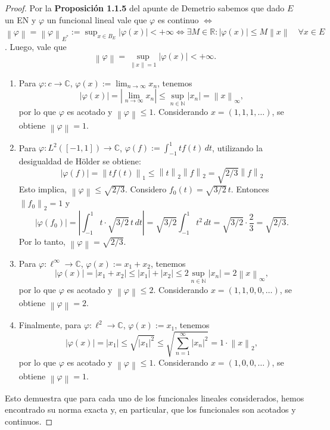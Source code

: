\documentclass{article}
\theoremstyle{definition}
\newcommand{\R}{\mathbb{R}}
\newcommand{\N}{\mathbb{N}}
\newcommand{\C}{\mathbb{C}}
\newcommand{\norm}[1]{\left\lVert #1 \right\rVert}       %
\begin{document}
\begin{proof}
    Por la \textbf{Proposición 1.1.5} del apunte de Demetrio sabemos que dado \( E \) un EN y \( \varphi \) un funcional lineal vale que \( \varphi \) es continuo \( \iff \) \( \norm{\varphi} = \norm{\varphi}_{E^*} := \sup_{x \in B_E} |\varphi(x)| < +\infty \iff \exists M \in \R : |\varphi(x)| \le M \norm{x} \quad \forall x \in E \).
    Luego, vale que \[
        \norm{\varphi} = \sup_{\norm{x} = 1} |\varphi(x)| < +\infty.
    \]
    \begin{enumerate}
        \item Para \( \varphi:c\to\C \), \(\varphi(x):=\displaystyle\lim_{n\to\infty}x_n\), tenemos
              \[
                  |\varphi(x)| = \left|\lim_{n\to\infty} x_n\right| \leq \sup_{n\in\N} |x_n| = \norm{x}_\infty,
              \]
              por lo que \( \varphi \) es acotado y \( \norm{\varphi} \leq 1 \). Considerando \( x = (1,1,1,\dots) \), se obtiene \( \norm{\varphi} = 1 \).
        \item Para \( \varphi:L^2([-1,1])\to\C \), \(\varphi(f):=\displaystyle\int_{-1}^1 t f(t)\,dt\), utilizando la desigualdad de H\"older se obtiene:\[
                  |\varphi(f)| = \norm{t f(t)}_1 \leq \norm{t}_2 \norm{f}_2 = \sqrt{2/3} \norm{f}_2
              \]
              Esto implica, \( \norm{\varphi} \leq \sqrt{2/3} \). Considero \( f_0(t) = \sqrt{3/2} \, t \). Entonces \( \norm{f_0}_2 = 1 \) y
              \[
                  |\varphi(f_0)| = \left|\int_{-1}^1 t \cdot \sqrt{3/2} \, t \, dt\right| = \sqrt{3/2} \int_{-1}^1 t^2 \, dt = \sqrt{3/2} \cdot \frac{2}{3} = \sqrt{2/3}.
              \]
              Por lo tanto, \( \norm{\varphi} = \sqrt{2/3} \).
        \item Para \( \varphi:\ell^\infty\to\C \), \(\varphi(x):=x_1 + x_2\), tenemos
              \[
                  |\varphi(x)| = |x_1 + x_2| \leq |x_1| + |x_2| \leq 2 \sup_{n\in\N} |x_n| = 2 \norm{x}_\infty,
              \]
              por lo que \( \varphi \) es acotado y \( \norm{\varphi} \leq 2 \). Considerando \( x = (1,1,0,0,\dots) \), se obtiene \( \norm{\varphi} = 2 \).
        \item Finalmente, para \( \varphi:\ell^2\to\C \), \(\varphi(x):=x_1\), tenemos
              \[
                  |\varphi(x)| = |x_1| \leq \sqrt{|x_1|^2} \leq \sqrt{\sum_{n=1}^\infty |x_n|^2} = 1 \cdot \norm{x}_2,
              \]
              por lo que \( \varphi \) es acotado y \( \norm{\varphi} \leq 1 \). Considerando \( x = (1,0,0,\dots) \), se obtiene \( \norm{\varphi} = 1 \).
    \end{enumerate}

    Esto demuestra que para cada uno de los funcionales lineales considerados, hemos encontrado su norma exacta y, en particular, que los funcionales son acotados y continuos.
\end{proof}
\end{document}
